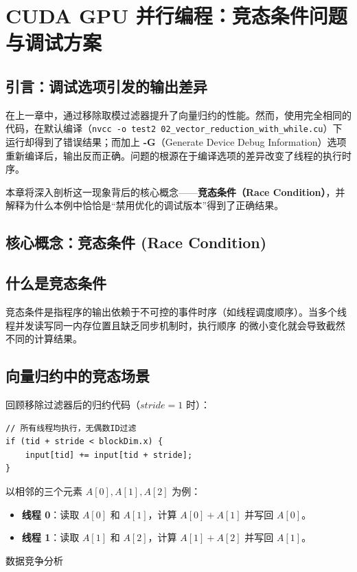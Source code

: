 \section{CUDA GPU 并行编程：竞态条件问题与调试方案}


\subsection{引言：调试选项引发的输出差异}
在上一章中，通过移除取模过滤器提升了向量归约的性能。然而，使用完全相同的代码，在默认编译（\lstinline{nvcc -o test2 02_vector_reduction_with_while.cu}）下运行却得到了错误结果；而加上 \textbf{-G}（Generate Device Debug Information）选项重新编译后，输出反而正确。问题的根源在于编译选项的差异改变了线程的执行时序。


本章将深入剖析这一现象背后的核心概念——\textbf{竞态条件（Race Condition）}，并解释为什么本例中恰恰是“禁用优化的调试版本”得到了正确结果。

\subsection{核心概念：竞态条件 (Race Condition)}

\subsection{什么是竞态条件}
竞态条件是指程序的输出依赖于不可控的事件时序（如线程调度顺序）。当多个线程并发读写同一内存位置且缺乏同步机制时，执行顺序
的微小变化就会导致截然不同的计算结果。

\subsection{向量归约中的竞态场景}
回顾移除过滤器后的归约代码（$stride=1$ 时）：
\begin{lstlisting}
// 所有线程均执行，无偶数ID过滤
if (tid + stride < blockDim.x) {
    input[tid] += input[tid + stride];
}
\end{lstlisting}

以相邻的三个元素 $A[0], A[1], A[2]$ 为例：
\begin{itemize}
    \item \textbf{线程 0}：读取 $A[0]$ 和 $A[1]$，计算 $A[0] + A[1]$ 并写回 $A[0]$。
    \item \textbf{线程 1}：读取 $A[1]$ 和 $A[2]$，计算 $A[1] + A[2]$ 并写回 $A[1]$。
\end{itemize}

数据竞争分析

